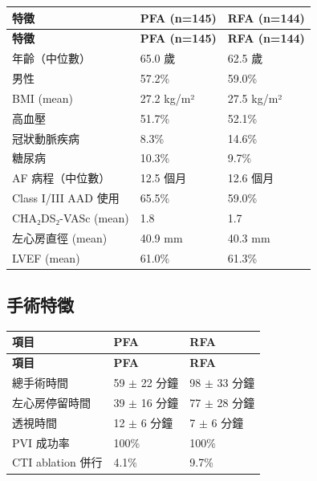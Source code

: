 \documentclass[12pt,a4paper]{article}
\begin{document}
\begin{longtable}{p{5cm}p{4cm}p{4cm}}
\toprule
\textbf{特徵} & \textbf{PFA (n=145)} & \textbf{RFA (n=144)} \\
\midrule
\endfirsthead
\midrule
\textbf{特徵} & \textbf{PFA (n=145)} & \textbf{RFA (n=144)} \\
\midrule
\endhead
\bottomrule
\endfoot
年齡（中位數） & 65.0 歲 & 62.5 歲 \\
\midrule
男性 & 57.2\% & 59.0\% \\
\midrule
BMI (mean) & 27.2 kg/m² & 27.5 kg/m² \\
\midrule
高血壓 & 51.7\% & 52.1\% \\
\midrule
冠狀動脈疾病 & 8.3\% & 14.6\% \\
\midrule
糖尿病 & 10.3\% & 9.7\% \\
\midrule
AF 病程（中位數） & 12.5 個月 & 12.6 個月 \\
\midrule
Class I/III AAD 使用 & 65.5\% & 59.0\% \\
\midrule
CHA₂DS₂-VASc (mean) & 1.8 & 1.7 \\
\midrule
左心房直徑 (mean) & 40.9 mm & 40.3 mm \\
\midrule
LVEF (mean) & 61.0\% & 61.3\% \\
\bottomrule
\end{longtable}

\subsection{手術特徵}

\begin{longtable}{p{5cm}p{4cm}p{4cm}}
\toprule
\textbf{項目} & \textbf{PFA} & \textbf{RFA} \\
\midrule
\endfirsthead
\midrule
\textbf{項目} & \textbf{PFA} & \textbf{RFA} \\
\midrule
\endhead
\bottomrule
\endfoot
總手術時間 & 59 $\pm$ 22 分鐘 & 98 $\pm$ 33 分鐘 \\
\midrule
左心房停留時間 & 39 $\pm$ 16 分鐘 & 77 $\pm$ 28 分鐘 \\
\midrule
透視時間 & 12 $\pm$ 6 分鐘 & 7 $\pm$ 6 分鐘 \\
\midrule
PVI 成功率 & 100\% & 100\% \\
\midrule
CTI ablation 併行 & 4.1\% & 9.7\% \\
\bottomrule
\end{longtable}

\end{document}

